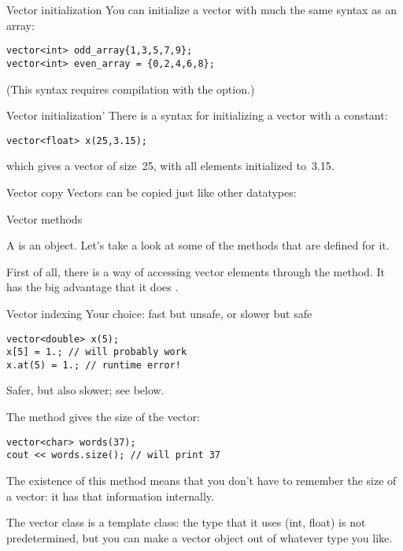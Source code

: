 \begin{block}{Vector initialization}
  \label{sl:vector-init}
  You can initialize a vector with much the same syntax as an array:
\begin{verbatim}
vector<int> odd_array{1,3,5,7,9};
vector<int> even_array = {0,2,4,6,8};
\end{verbatim}
(This syntax requires compilation with the 
option.)
\end{block}

\begin{block}{Vector initialization'}
  \label{sl:vector-initconst}
  There is a syntax for initializing a vector with a constant:
\begin{verbatim}
vector<float> x(25,3.15);
\end{verbatim}
which gives a vector of size~25, with all elements initialized to~3.15.
\end{block}

\begin{block}{Vector copy}
  \label{sl:vectorcopy}
  Vectors can be copied just like other datatypes:
\end{block}

 {Vector methods}

A  is an object. Let's take a look at some of the methods
that are defined for it.

First of all, there is a way of accessing vector elements through the
 method. It has the big advantage that it does
.
\begin{block}{Vector indexing}
  \label{sl:vector-index}
  Your choice:  fast but unsafe, or slower but safe
\begin{verbatim}
vector<double> x(5);
x[5] = 1.; // will probably work
x.at(5) = 1.; // runtime error!
\end{verbatim}
\end{block}

Safer, but also slower; see below.

The method  gives the size of the vector:
\begin{verbatim}
vector<char> words(37);
cout << words.size(); // will print 37
\end{verbatim}
The existence of this method means that you don't have to remember the
size of a vector: it has that information internally.

\begin{advanced}
  The vector class is a template class: the type that it uses (int,
  float) is not predetermined, but you can make a vector object out of
  whatever type you like.
\end{advanced}

